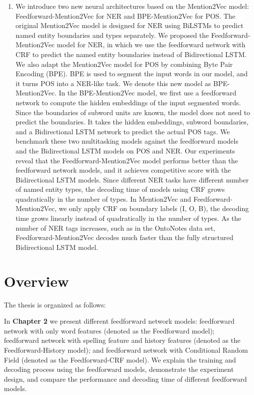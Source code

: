 \documentclass{sfuthesis}
\begin{document}
\begin{enumerate}
\item We introduce two new neural architectures based on the Mention2Vec model: Feedforward-Mention2Vec for NER and BPE-Mention2Vec for POS. The original Mention2Vec model is designed for NER using BiLSTMs to predict named entity boundaries and types separately. We proposed the Feedforward-Mention2Vec model for NER, in which we use the feedforward network with CRF to predict the named entity boundaries instead of Bidirectional LSTM. We also adapt the Mention2Vec model for POS by combining Byte Pair Encoding (BPE). BPE is used to segment the input words in our model, and it turns POS into a NER-like task. We denote this new model as BPE-Mention2Vec. In the BPE-Mention2Vec model, we first use a feedforward network to compute the hidden embeddings of the input segmented words. Since the boundaries of subword units are known, the model does not need to predict the boundaries. It takes the hidden embeddings, subword boundaries, and a Bidirectional LSTM network to predict the actual POS tags. We benchmark these two multitasking models against the feedforward models and the Bidirectional LSTM models on POS and NER. Our experiments reveal that the Feedforward-Mention2Vec model performs better than the feedforward network models, and it achieves competitive score with the Bidirectional LSTM models. Since different NER tasks have different number of named entity types, the decoding time of models using CRF grows quadratically in
the number of types. In Mention2Vec and Feedforward-Mention2Vec, we only apply CRF on boundary labels (I, O, B), the decoding time grows linearly instead of quadratically in the number of types. As the number of NER tags increases, such as in the OntoNotes data set, Feedforward-Mention2Vec decodes much faster than the fully structured Bidirectional LSTM model.

\end{enumerate}


\section{Overview}
The thesis is organized as follows:

In \textbf{Chapter 2}  we present different feedforward network models: feedforward network with only word features (denoted as the Feedforward model); feedforward network with spelling feature and history features (denoted as the Feedforward-History model); and feedforward network with Conditional Random Field (denoted as the Feedforward-CRF model). We explain the training and decoding process using the feedforward models, demonstrate the experiment design, and compare the performance and decoding time of different feedforward models.
\end{document}
